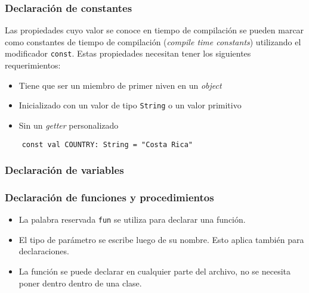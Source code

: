 %


\subsubsection{Declaración de constantes}
Las propiedades cuyo valor se conoce en tiempo de compilación se pueden marcar como constantes de tiempo de compilación (\emph{compile time constants}) utilizando el modificador \texttt{const}. Estas propiedades necesitan tener los siguientes requerimientos:
\begin{itemize}
    \item Tiene que ser un miembro de primer niven en un \emph{object}
    \item Inicializado con un valor de tipo \texttt{String} o un valor primitivo
    \item Sin un \emph{getter} personalizado
\end{itemize}

\begin{verbatim}
    const val COUNTRY: String = "Costa Rica"
\end{verbatim}

\subsubsection{Declaración de variables}

\subsubsection{Declaración de funciones y procedimientos}
\begin{itemize}
    \item La palabra reservada \texttt{fun} se utiliza para declarar una función. 
    \item El tipo de parámetro se escribe luego de su nombre. Esto aplica también para declaraciones.
    \item La función se puede declarar en cualquier parte del archivo, no se necesita poner dentro dentro de una clase.
\end{itemize}

